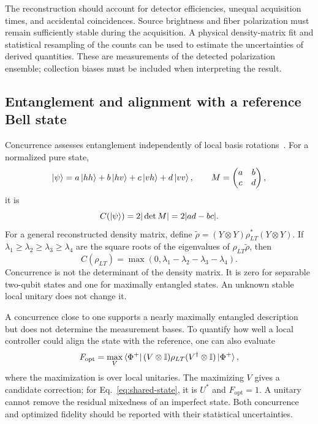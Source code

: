 \documentclass[a4paper,10pt]{article}
\newcommand{\I}{\mathbb{I}}
\begin{document}
The reconstruction should account for detector efficiencies, unequal
acquisition times, and accidental coincidences. Source brightness and
fiber polarization must remain sufficiently stable during the acquisition.
A physical density-matrix fit and statistical resampling of the counts
can be used to estimate the uncertainties of derived quantities.
These are measurements of the detected polarization ensemble; collection
biases must be included when interpreting the result.

\subsection{Entanglement and alignment with a reference Bell state}

Concurrence assesses entanglement independently of local basis
rotations~\cite{Wootters1998Concurrence}. For a normalized pure state,
\begin{equation}
    \ket\psi=a\ket{hh}+b\ket{hv}+c\ket{vh}+d\ket{vv},
    \qquad
    M=\begin{pmatrix}a&b\\c&d\end{pmatrix},
\end{equation}
it is
\begin{equation}
    C(\ket\psi)=2|\det M|=2|ad-bc|.
\end{equation}
For a general reconstructed density matrix, define
$\widetilde\rho=(Y\otimes Y)\rho_{LT}^*(Y\otimes Y)$. If
$\lambda_1\geq\lambda_2\geq\lambda_3\geq\lambda_4$ are the square roots
of the eigenvalues of $\rho_{LT}\widetilde\rho$, then
\begin{equation}
    C(\rho_{LT})
    =\max(0,\lambda_1-\lambda_2-\lambda_3-\lambda_4).
    \label{eq:concurrence}
\end{equation}
Concurrence is not the determinant of the density matrix. It is zero for
separable two-qubit states and one for maximally entangled states.
An unknown stable local unitary does not change it.

A concurrence close to one supports a nearly maximally entangled
description but does not determine the measurement bases. To quantify
how well a local controller could align the state with the reference,
one can also evaluate
\begin{equation}
    F_{\mathrm{opt}}
    =\max_V
    \bra{\Phi^+}(V\otimes\I)\rho_{LT}
        (V^\dagger\otimes\I)\ket{\Phi^+},
    \label{eq:optimized-bell-fidelity}
\end{equation}
where the maximization is over local unitaries. The maximizing $V$ gives
a candidate correction; for Eq.~\eqref{eq:shared-state}, it is $U^*$ and
$F_{\mathrm{opt}}=1$. A unitary cannot remove the residual mixedness of
an imperfect state. Both concurrence and optimized fidelity should be
reported with their statistical uncertainties.
\end{document}
